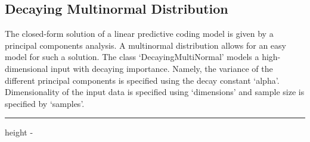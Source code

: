 \documentclass[letterpaper,10pt,english]{sphinxmanual}
\newlength\nbsphinxcodecellspacing
\begin{document}
\subsection{Decaying Multinormal Distribution}
\label{\detokenize{usage/datasets:Decaying-Multinormal-Distribution}}
The closed-form solution of a linear predictive coding model is given by a principal components analysis. A multinormal distribution allows for an easy model for such a solution. The class ‘DecayingMultiNormal’ models a high-dimensional input with decaying importance. Namely, the variance of the different principal components is specified using the decay constant ‘alpha’. Dimensionality of the input data is specified using ‘dimensions’ and sample size is specified by ‘samples’.

{
\begin{sphinxVerbatim}[commandchars=\\\{\}]
\llap{\color{nbsphinxin}[3]:\,\hspace{\fboxrule}\hspace{\fboxsep}}    
                                      
                                      
   
\end{sphinxVerbatim}
}

{
\begin{sphinxVerbatim}[commandchars=\\\{\}]
\llap{\color{nbsphinxin}[7]:\,\hspace{\fboxrule}\hspace{\fboxsep}}   
\end{sphinxVerbatim}
}

\hrule height -\fboxrule\relax
\vspace{\nbsphinxcodecellspacing}

\makeatletter\setbox\nbsphinxpromptbox\box\voidb@x\makeatother
\end{document}
